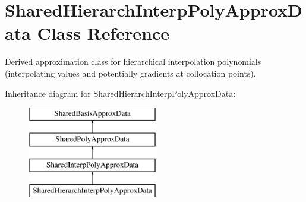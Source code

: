 \section{Shared\+Hierarch\+Interp\+Poly\+Approx\+Data Class Reference}
\label{classPecos_1_1SharedHierarchInterpPolyApproxData}


Derived approximation class for hierarchical interpolation polynomials (interpolating values and potentially gradients at collocation points).  


Inheritance diagram for Shared\+Hierarch\+Interp\+Poly\+Approx\+Data\+:\begin{figure}[H]
\begin{center}
\leavevmode
\includegraphics[height=4.000000cm]{classPecos_1_1SharedHierarchInterpPolyApproxData}
\end{center}
\end{figure}
